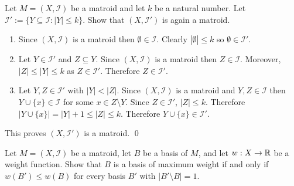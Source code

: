 \documentclass[10pt]{article}
\begin{document}
\maketitle



\begin{problem}[Problem 10.5]
Let \( M = (X, \mathcal{I} ) \) be a matroid and let \( k \) be a natural number. Let \( \mathcal{I}'  := \{Y\subseteq \mathcal{I}  : |Y| \leq k\} \). Show that \( (X, \mathcal{I}' ) \) is again a matroid.
\end{problem}

\begin{solution}

\begin{enumerate}[label=(\roman*)]
    \item Since \( (X, \mathcal{I} ) \) is a matroid then \( \emptyset \in \mathcal{I} \). Clearly \( |\emptyset| \leq k \) so \( \emptyset \in \mathcal{I} ' \).
    \item Let \( Y \in \mathcal{I}' \) and \( Z\subseteq Y \). Since \( (X, \mathcal{I} ) \) is a matroid then \( Z\in \mathcal{I} \).  Moreover, \( |Z| \leq |Y| \leq k \) as \( Z\in \mathcal{I} ' \). Therefore \( Z\in \mathcal{I} ' \).
    \item Let \( Y,Z\in  \mathcal{I}' \) with \( |Y|<|Z| \). Since \( (X, \mathcal{I} ) \) is a matroid and \( Y,Z\in \mathcal{I} \) then \( Y\cup \{x\} \in \mathcal{I} \) for some \( x\in Z \setminus Y \). Since \( Z\in \mathcal{I} ' \), \( |Z|\leq k \). Therefore \( |Y\cup \{x\}| = |Y|+ 1 \leq |Z| \leq k \). Therefore \( Y\cup\{x\} \in \mathcal{I} ' \).
\end{enumerate}

This proves \( (X, \mathcal{I} ') \) is a matroid. \qed

\end{solution}

\begin{problem}[Problem 10.19]
    Let \( M = (X, \mathcal{I} ) \) be a matroid, let \( B \) be a basis of \( M \), and let \( w: X\to\mathbb{R} \) be a weight function. Show that \( B \) is a basis of maximum weight if and only if \( w(B') \leq w(B) \) for every basis \( B' \) with \( |B' \setminus B| = 1 \).
\end{problem}
\end{document}
